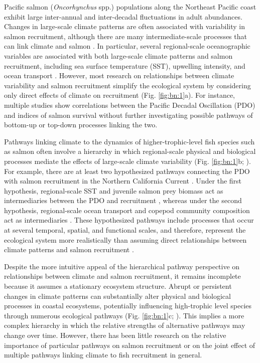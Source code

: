 Pacific salmon (\emph{Oncorhynchus} spp.) populations along the Northeast
Pacific coast exhibit large inter-annual and inter-decadal fluctuations in adult
abundances. Changes in large-scale climate patterns are often associated with
variability in salmon recruitment, although there are many intermediate-scale
processes that can link climate and salmon \citep{Mueter2002a, Beamish2004b,
Drinkwater2010a, Malick2015a}. In particular, several regional-scale
oceanographic variables are associated with both large-scale climate patterns
and salmon recruitment, including sea surface temperature (SST), upwelling
intensity, and ocean transport \citep{King2011, Chavez2003a, Keister2011a}.
However, most research on relationships between climate variability and salmon
recruitment simplify the ecological system by considering only direct effects of
climate on recruitment (Fig. \ref{fig:bn:1}a). For instance, multiple studies
show correlations between the Pacific Decadal Oscillation (PDO) and indices of
salmon survival \citep{Mantua1997a, Burke2013, Malick2009a} without further
investigating possible pathways of bottom-up or top-down processes linking the
two.

Pathways linking climate to the dynamics of higher-trophic-level fish species
such as salmon often involve a hierarchy in which regional-scale physical and
biological processes mediate the effects of large-scale climate variability
(Fig. \ref{fig:bn:1}b; \citealp{Drinkwater2010a, Ottersen2010a, Dippner2006}).
For example, there are at least two hypothesized pathways connecting the PDO
with salmon recruitment in the Northern California Current \citep{Wells2008a,
Keister2011a}. Under the first hypothesis, regional-scale SST and juvenile
salmon prey biomass act as intermediaries between the PDO and recruitment
\citep{Daly2013, Cole2000a}, whereas under the second hypothesis, regional-scale
ocean transport and copepod community composition act as intermediaries
\citep{Bi2011a, Keister2011a}. These hypothesized pathways include processes
that occur at several temporal, spatial, and functional scales, and therefore,
represent the ecological system more realistically than assuming direct
relationships between climate patterns and salmon recruitment \citep{Levin1992a,
Ottersen2010a, Bakun1996a, Hunt2002a}.

Despite the more intuitive appeal of the hierarchical pathway perspective on
relationships between climate and salmon recruitment, it remains incomplete
because it assumes a stationary ecosystem structure.  Abrupt or persistent
changes in climate patterns can substantially alter physical and biological
processes in coastal ecosystems, potentially influencing high-trophic level
species through numerous ecological pathways (Fig. \ref{fig:bn:1}c;
\citealp{Anderson1999a, Mantua1997a}). This implies a more complex hierarchy in
which the relative strengths of alternative pathways may change over time.
However, there has been little research on the relative importance of particular
pathways on salmon recruitment or on the joint effect of multiple pathways
linking climate to fish recruitment in general.

